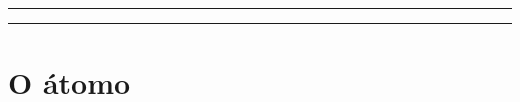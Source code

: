 \documentclass{article}
\begin{document}
\maketitle

\hrule
\vspace{2px}
\hrule 
\vspace{0.5cm}

 \section*{O átomo}
\end{document}
